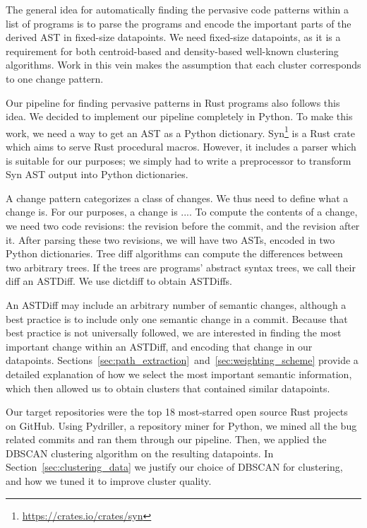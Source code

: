 The general idea for automatically finding the pervasive code patterns within a list of programs is to parse the programs and encode the important parts of the derived AST in fixed-size datapoints. We need fixed-size datapoints, as it is a requirement for both centroid-based and density-based well-known clustering algorithms. Work in this vein makes the assumption that each cluster corresponds to one change pattern.

Our pipeline for finding pervasive patterns in Rust programs also follows this idea. We decided to implement our pipeline completely in Python. To make this work, we need a way to get an AST as a Python dictionary. Syn\footnote{\url{https://crates.io/crates/syn}} is a Rust crate which aims to serve Rust procedural macros. However, it includes a parser which is suitable for our purposes; we simply had to write a preprocessor to transform Syn AST output into Python dictionaries.

A change pattern categorizes a class of changes. We thus need to define what a change is. For our purposes, a change is ....
To compute the contents of a change, we need two code revisions: the revision before the commit, and the revision after it. After parsing these two revisions, we will have two ASTs, encoded in two Python dictionaries. Tree diff algorithms can compute the differences between two arbitrary trees. If the trees are programs' abstract syntax trees, we call their diff an ASTDiff. We use dictdiff to obtain ASTDiffs.

An ASTDiff may include an arbitrary number of semantic changes, although a best practice is to include only one semantic change in a commit. Because that best practice is not universally followed, we are interested in finding the most important change within an ASTDiff, and encoding that change in our datapoints. Sections~\ref{sec:path_extraction}~and~\ref{sec:weighting_scheme} provide a detailed explanation of how we select the most important semantic information, which then allowed us to obtain clusters that contained similar datapoints. 

Our target repositories were the top 18 most-starred open source Rust projects on GitHub. Using Pydriller, a repository miner for Python, we mined all the bug related commits and ran them through our pipeline. Then, we applied the DBSCAN clustering algorithm on the resulting datapoints. In Section~\ref{sec:clustering_data} we justify our choice of DBSCAN for clustering, and how we tuned it to improve cluster quality. 

